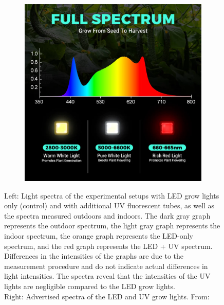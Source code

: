 \documentclass[
    12pt,
    aspectratio=1610,
    b,
    bibliography=../bibliography.bib,
    link-citations]{beamer}
\begin{document}
\begin{frame}
\begin{figure}
\begin{minipage}[b]{0.45\textwidth}
\begin{subfigure}[b]{0.55\textwidth}
                    \includegraphics[width=0.8\linewidth]{PHLIZON_PH-FD8-E_light-spectrum}
                \end{subfigure}
            \end{minipage}
            \caption{\scriptsize
                Left: Light spectra of the experimental setups with LED grow lights only (control) and with additional UV fluorescent tubes, as well as the spectra measured outdoors and indoors. The dark gray graph represents the outdoor spectrum, the light gray graph represents the indoor spectrum, the orange graph represents the LED-only spectrum, and the red graph represents the LED + UV spectrum. Differences in the intensities of the graphs are due to the measurement procedure and do not indicate actual differences in light intensities. The spectra reveal that the intensities of the UV lights are negligible compared to the LED grow lights. \\ \vspace{0.5em}
                Right: Advertised spectra of the LED and UV grow lights. From: \textcite{noauthor_luxelite_plantuv_nodate, noauthor_phlizon_fd6000-640w-upgraded_nodate}}
        \end{figure}
    \end{frame}
\end{document}
